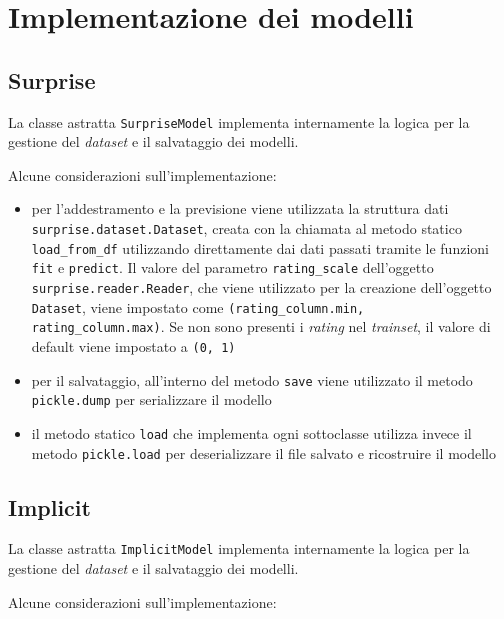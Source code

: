 \section{Implementazione dei modelli}

\subsection{Surprise}

La classe astratta \texttt{SurpriseModel} implementa internamente la logica per la gestione del \textit{dataset} e il salvataggio dei modelli. 

Alcune considerazioni sull'implementazione:

\begin{itemize}
    \item per l'addestramento e la previsione viene utilizzata la struttura dati \\ \texttt{surprise.dataset.Dataset}, creata con la chiamata al metodo statico \\ \texttt{load\_from\_df} utilizzando direttamente dai dati passati tramite le funzioni \texttt{fit} e \texttt{predict}. Il valore del parametro \texttt{rating\_scale} dell'oggetto \\ \texttt{surprise.reader.Reader}, che viene utilizzato per la creazione dell'oggetto \texttt{Dataset}, viene impostato come \texttt{(rating\_column.min, \\ rating\_column.max)}. Se non sono presenti i \textit{rating} nel \textit{trainset}, il valore di default viene impostato a \texttt{(0, 1)}
    \item per il salvataggio, all'interno del metodo \texttt{save} viene utilizzato il metodo \texttt{pickle.dump} per serializzare il modello
    \item il metodo statico \texttt{load} che implementa ogni sottoclasse utilizza invece il metodo \texttt{pickle.load} per deserializzare il file salvato e ricostruire il modello
\end{itemize}

\subsection{Implicit}

La classe astratta \texttt{ImplicitModel} implementa internamente la logica per la gestione del \textit{dataset} e il salvataggio dei modelli. 

Alcune considerazioni sull'implementazione:

